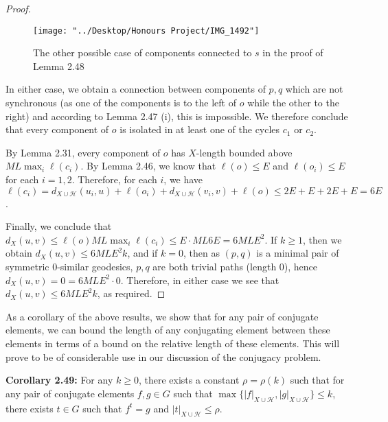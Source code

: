 \documentclass[12pt]{article}
\newcommand{\vs}{\vskip10pt}
\begin{document}
\begin{proof}
\begin{figure} [H]
	\centering
	\texttt{[image: "../Desktop/Honours Project/IMG\_1492"]}
	\caption{The other possible case of components connected to $s$ in the proof of Lemma 2.48}
	\label{fig:img1492}
\end{figure}

		In either case, we obtain a connection between components of $p,q$ which are not synchronous (as one of the components is to the left of $o$ while the other to the right) and according to Lemma 2.47 (i), this is impossible. We therefore conclude that every component of $o$ is isolated in at least one of the cycles $c_1$ or $c_2$. 
		
		\vs 
		
		By Lemma 2.31, every component of $o$ has $X$-length bounded above $ML \max_i \ell(c_i)$. By Lemma 2.46, we know that $\ell(o) \leq E$ and $\ell(o_i) \leq E$ for each $i=1,2$. Therefore, for each $i$, we have $\ell(c_i) = d_{X \cup \mathcal{H}}(u_i, u) + \ell(o_i) + d_{X \cup \mathcal{H}} (v_i, v) + \ell(o) \leq 2E + E + 2E + E = 6E$. 
		
		\vs 
		
		Finally, we conclude that $d_X(u,v) \leq \ell(o) ML \max_i \ell(c_i) \leq E \cdot ML6E = 6MLE^2$. If $k \geq 1$, then we obtain $d_X(u,v) \leq 6 ML E^2 k$, and if $k = 0$, then as $(p,q)$ is a minimal pair of symmetric 0-similar geodesics, $p,q$ are both trivial paths (length 0), hence $d_X(u,v) = 0 = 6ML E^2 \cdot 0$. Therefore, in either case we see that $d_X (u,v) \leq 6 ML E^2 k$, as required. 
		
	\end{proof}

	As a corollary of the above results, we show that for any pair of conjugate elements, we can bound the length of any conjugating element between these elements in terms of a bound on the relative length of these elements. This will prove to be of considerable use in our discussion of the conjugacy problem. 
	
	\vs 
	
	\textbf{Corollary 2.49: } For any $k \geq 0$, there exists a constant $\rho = \rho(k)$ such that for any pair of conjugate elements $f,g \in G$ such that $\max \{\vert f \vert_{X \cup \mathcal{H}}, \vert g \vert_{X \cup \mathcal{H}}\} \leq k$, there exists $t \in G$ such that $f^t = g$ and $\vert t \vert_{X \cup \mathcal{H}} \leq \rho$. 
	
\end{document}
